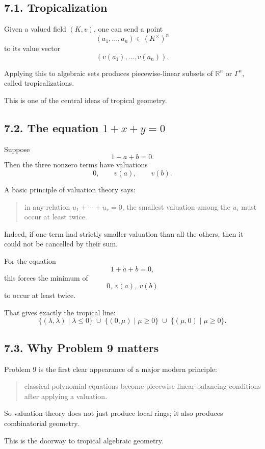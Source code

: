 \documentclass[12pt,a4paper]{article}
\theoremstyle{plain}
\theoremstyle{definition}      %
\begin{document}
\subsection*{7.1. Tropicalization}

Given a valued field \((K,v)\), one can send a point
\[
(a_1,\dots,a_n)\in (K^\times)^n
\]
to its value vector
\[
(v(a_1),\dots,v(a_n)).
\]

Applying this to algebraic sets produces piecewise-linear subsets of \(\mathbb{R}^n\) or \(\Gamma^n\), called tropicalizations.

This is one of the central ideas of tropical geometry.

\subsection*{7.2. The equation \texorpdfstring{$1+x+y=0$}{1+x+y=0}}

Suppose
\[
1+a+b=0.
\]
Then the three nonzero terms have valuations
\[
0,\qquad v(a),\qquad v(b).
\]

A basic principle of valuation theory says:
\begin{quote}
	in any relation \(u_1+\cdots+u_r=0\), the smallest valuation among the \(u_i\) must occur at least twice.
\end{quote}

Indeed, if one term had strictly smaller valuation than all the others, then it could not be cancelled by their sum.

For the equation
\[
1+a+b=0,
\]
this forces the minimum of
\[
0,\ v(a),\ v(b)
\]
to occur at least twice.

That gives exactly the tropical line:
\[
\{(\lambda,\lambda)\mid \lambda\le 0\}
\;\cup\;
\{(0,\mu)\mid \mu\ge 0\}
\;\cup\;
\{(\mu,0)\mid \mu\ge 0\}.
\]

\subsection*{7.3. Why Problem 9 matters}

Problem 9 is the first clear appearance of a major modern principle:
\begin{quote}
	classical polynomial equations become piecewise-linear balancing conditions after applying a valuation.
\end{quote}

So valuation theory does not just produce local rings; it also produces combinatorial geometry.

This is the doorway to tropical algebraic geometry.
\end{document}

